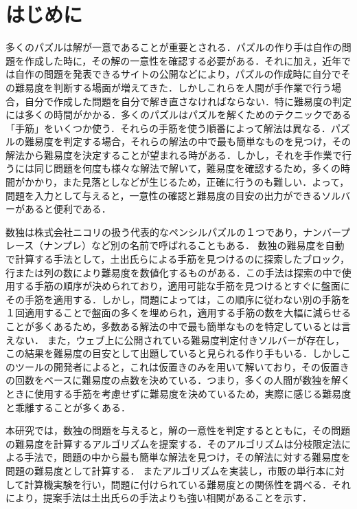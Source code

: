\documentclass[submit,techrep,noauthor]{ipsj}
\begin{document}
\section{はじめに}
多くのパズルは解が一意であることが重要とされる．パズルの作り手は自作の問題を作成した時に，その解の一意性を確認する必要がある．それに加え，近年では自作の問題を発表できるサイトの公開などにより，パズルの作成時に自分でその難易度を判断する場面が増えてきた\cite{PuzzleSq83:online}．しかしこれらを人間が手作業で行う場合，自分で作成した問題を自分で解き直さなければならない．特に難易度の判定には多くの時間がかかる．多くのパズルはパズルを解くためのテクニックである「手筋」をいくつか使う．それらの手筋を使う順番によって解法は異なる．パズルの難易度を判定する場合，それらの解法の中で最も簡単なものを見つけ，その解法から難易度を決定することが望まれる時がある．しかし，それを手作業で行うには同じ問題を何度も様々な解法で解いて，難易度を確認するため，多くの時間がかかり，また見落としなどが生じるため，正確に行うのも難しい．よって，問題を入力として与えると，一意性の確認と難易度の目安の出力ができるソルバーがあると便利である．

数独は株式会社ニコリの扱う代表的なペンシルパズルの１つであり，ナンバープレース（ナンプレ）など別の名前で呼ばれることもある．
数独の難易度を自動で計算する手法として，土出氏らによる手筋を見つけるのに探索したブロック，行または列の数により難易度を数値化するものがある\cite{土出智也2011数独パズルの難易度判定}．この手法は探索の中で使用する手筋の順序が決められており，適用可能な手筋を見つけるとすぐに盤面にその手筋を適用する．しかし，問題によっては，この順序に従わない別の手筋を１回適用することで盤面の多くを埋められ，適用する手筋の数を大幅に減らせることが多くあるため，多数ある解法の中で最も簡単なものを特定しているとは言えない．%
また，ウェブ上に公開されている難易度判定付きソルバーが存在し\cite{ペンシルパズルソ48:online}，この結果を難易度の目安として出題していると見られる作り手もいる．しかしこのツールの開発者によると，これは仮置きのみを用いて解いており，その仮置きの回数をベースに難易度の点数を決めている\cite{みゃーみゃさんは39:online}．つまり，多くの人間が数独を解くときに使用する手筋を考慮せずに難易度を決めているため，実際に感じる難易度と乖離することが多くある．

本研究では，数独の問題を与えると，解の一意性を判定するとともに，その問題の難易度を計算するアルゴリズムを提案する．そのアルゴリズムは分枝限定法による手法で，問題の中から最も簡単な解法を見つけ，その解法に対する難易度を問題の難易度として計算する．%
またアルゴリズムを実装し，市販の単行本に対して計算機実験を行い，問題に付けられている難易度との関係性を調べる．それにより，提案手法は土出氏らの手法よりも強い相関があることを示す．
\end{document}
